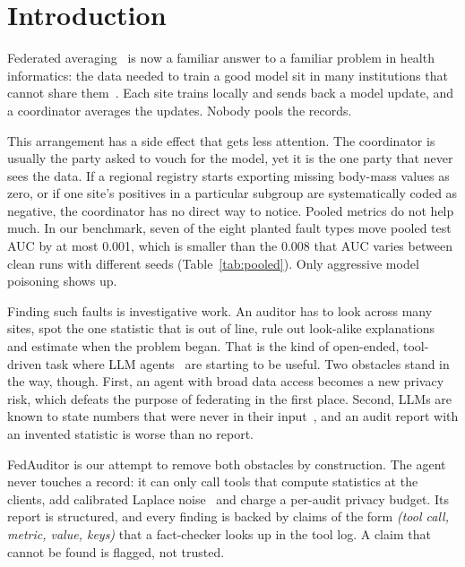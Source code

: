 \documentclass[conference]{IEEEtran}
\begin{document}
\section{Introduction}

Federated averaging~\cite{mcmahan2017fedavg} is now a familiar answer to a familiar problem in
health informatics: the data needed to train a good model sit in many institutions that cannot
share them~\cite{rieke2020future,kairouz2021advances}. Each site trains locally and sends back a
model update, and a coordinator averages the updates. Nobody pools the records.

This arrangement has a side effect that gets less attention. The coordinator is usually the party
asked to vouch for the model, yet it is the one party that never sees the data. If a regional
registry starts exporting missing body-mass values as zero, or if one site's positives in a
particular subgroup are systematically coded as negative, the coordinator has no direct way to
notice. Pooled metrics do not help much. In our benchmark, seven of the eight planted fault types
move pooled test AUC by at most 0.001, which is smaller than the 0.008 that AUC varies between clean
runs with different seeds (Table~\ref{tab:pooled}). Only aggressive model poisoning shows up.

Finding such faults is investigative work. An auditor has to look across many sites, spot the one
statistic that is out of line, rule out look-alike explanations and estimate when the problem
began. That is the kind of open-ended, tool-driven task where LLM agents~\cite{yao2023react,
schick2023toolformer} are starting to be useful. Two obstacles stand in the way, though. First, an
agent with broad data access becomes a new privacy risk, which defeats the purpose of federating in
the first place. Second, LLMs are known to state numbers that were never in their
input~\cite{ji2023hallucination}, and an audit report with an invented statistic is worse than no
report.

FedAuditor is our attempt to remove both obstacles by construction. The agent never touches a
record: it can only call tools that compute statistics at the clients, add calibrated Laplace
noise~\cite{dwork2006calibrating} and charge a per-audit privacy budget. Its report is structured,
and every finding is backed by claims of the form \emph{(tool call, metric, value, keys)} that a
fact-checker looks up in the tool log. A claim that cannot be found is flagged, not trusted.
\end{document}
